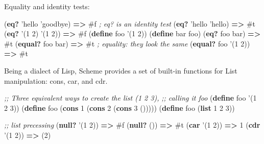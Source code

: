 \documentclass[12pt,a4paper,oneside,openright]{book}
\newenvironment{Shaded}{\begin{snugshade}}{\end{snugshade}}
\newcommand{\KeywordTok}[1]{\textcolor[rgb]{0.13,0.29,0.53}{\textbf{{#1}}}}
\newcommand{\DecValTok}[1]{\textcolor[rgb]{0.00,0.00,0.81}{{#1}}}
\newcommand{\CommentTok}[1]{\textcolor[rgb]{0.56,0.35,0.01}{\textit{{#1}}}}
\newcommand{\FunctionTok}[1]{\textcolor[rgb]{0.00,0.00,0.00}{{#1}}}
\newcommand{\NormalTok}[1]{{#1}}
\begin{document}
Equality and identity tests:

\begin{Shaded}
\begin{Highlighting}[]
    \NormalTok{(}\KeywordTok{eq?} \NormalTok{'hello 'goodbye)      }\KeywordTok{=>} \DecValTok{#f} \CommentTok{; eq? is an identity test}
    \NormalTok{(}\KeywordTok{eq?} \NormalTok{'hello 'hello)        }\KeywordTok{=>} \DecValTok{#t}
    \NormalTok{(}\KeywordTok{eq?} \NormalTok{'(}\DecValTok{1} \DecValTok{2}\NormalTok{) '(}\DecValTok{1} \DecValTok{2}\NormalTok{))        }\KeywordTok{=>} \DecValTok{#f}
    \NormalTok{(}\KeywordTok{define}\FunctionTok{ foo }\NormalTok{'(}\DecValTok{1} \DecValTok{2}\NormalTok{))}
    \NormalTok{(}\KeywordTok{define}\FunctionTok{ bar }\NormalTok{foo)}
    \NormalTok{(}\KeywordTok{eq?} \NormalTok{foo bar)              }\KeywordTok{=>} \DecValTok{#t}
    \NormalTok{(}\KeywordTok{equal?} \NormalTok{foo bar)           }\KeywordTok{=>} \DecValTok{#t} \CommentTok{; equality: they look the same}
    \NormalTok{(}\KeywordTok{equal?} \NormalTok{foo '(}\DecValTok{1} \DecValTok{2}\NormalTok{))        }\KeywordTok{=>} \DecValTok{#t}
\end{Highlighting}
\end{Shaded}

Being a dialect of Lisp, Scheme provides a set of built-in functions for
List manipulation: cons, car, and cdr.

\begin{Shaded}
\begin{Highlighting}[]
    \CommentTok{;; Three equivalent ways to create the list (1 2 3),}
    \CommentTok{;; calling it foo}
    \NormalTok{(}\KeywordTok{define}\FunctionTok{ foo }\NormalTok{'(}\DecValTok{1} \DecValTok{2} \DecValTok{3}\NormalTok{))}
    \NormalTok{(}\KeywordTok{define}\FunctionTok{ foo }\NormalTok{(}\KeywordTok{cons} \DecValTok{1} \NormalTok{(}\KeywordTok{cons} \DecValTok{2} \NormalTok{(}\KeywordTok{cons} \DecValTok{3} \NormalTok{()))))}
    \NormalTok{(}\KeywordTok{define}\FunctionTok{ foo }\NormalTok{(}\KeywordTok{list} \DecValTok{1} \DecValTok{2} \DecValTok{3}\NormalTok{))}

    \CommentTok{;; list precessing}
    \NormalTok{(}\KeywordTok{null?} \NormalTok{'(}\DecValTok{1} \DecValTok{2}\NormalTok{))             }\KeywordTok{=>} \DecValTok{#f}
    \NormalTok{(}\KeywordTok{null?} \NormalTok{())                 }\KeywordTok{=>} \DecValTok{#t}
    \NormalTok{(}\KeywordTok{car} \NormalTok{'(}\DecValTok{1} \DecValTok{2}\NormalTok{))               }\KeywordTok{=>} \DecValTok{1}
    \NormalTok{(}\KeywordTok{cdr} \NormalTok{'(}\DecValTok{1} \DecValTok{2}\NormalTok{))               }\KeywordTok{=>} \NormalTok{(}\DecValTok{2}\NormalTok{)}
\end{Highlighting}
\end{Shaded}
\end{document}
